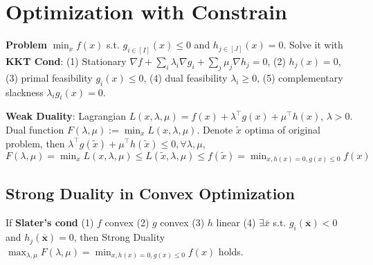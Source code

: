 \section{Optimization with Constrain}

\textbf{Problem} $\min_{x} f(x)$ s.t. $g_{i\in [I]}(x)\leq 0$ and $h_{j\in[J]}(x)=0$. 
Solve it with \textbf{KKT Cond}: (1) Stationary $\nabla f + \sum_{i}\lambda_i\nabla g_i + \sum_j \mu_j \nabla h_j = 0$, (2) $h_j(x) = 0$, (3) primal feasibility $g_i(x)\leq 0$, (4) dual feasibility $\lambda_i\geq 0$, (5) complementary slackness $\lambda_i g_i(x) = 0$.

\textbf{Weak Duality}: Lagrangian $L(x,\lambda,\mu) = f(x)+\lambda^{\top}g(x) + \mu^{\top}h(x)$, $\lambda > 0$. Dual function $F(\lambda,\mu):=\min_x L(x,\lambda,\mu)$. Denote $\tilde{x}$ optima of original problem, then $\lambda^{\top}g(\tilde{x})+\mu^{\top}h(\tilde{x})\leq 0, \forall \lambda,\mu$, $F(\lambda,\mu) = \min_x L(x,\lambda,\mu)\leq L(\tilde{x},\lambda,\mu)\leq f(\tilde{x})=\min_{x,h(x)=0,g(x)\leq0} f(x)$

\subsection*{Strong Duality in Convex Optimization} 
If \textbf{Slater's cond} (1) $f$ convex (2) $g$ convex (3) $h$ linear (4) $\exists \bar{x}$ s.t. $g_{i}(\overline{\mathbf{x}})<0$ and $h_{j}(\overline{\mathbf{x}})=0$, then Strong Duality $\max_{\lambda,\mu} F(\lambda,\mu) = \min_{x,h(x)=0,g(x)\leq0} f(x)$ holds.






